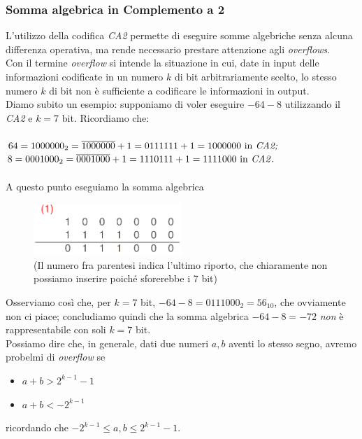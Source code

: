\subsubsection{Somma algebrica in Complemento a 2} L'utilizzo della codifica \textit{CA2} permette di eseguire somme algebriche senza alcuna differenza operativa, ma rende necessario prestare attenzione agli \textit{overflows}.\\
Con il termine \textit{overflow} si intende la situazione in cui, date in input delle informazioni codificate in un numero $k$ di bit arbitrariamente scelto, lo stesso numero $k$ di bit non è sufficiente a codificare le informazioni in output. \\
Diamo subito un esempio: supponiamo di voler eseguire $-64-8$ utilizzando il \textit{CA2} e $k=7$ bit. Ricordiamo che:\\\\
$64=1000000_{2}=\overline{1000000}+1=0111111+1=1000000 \text{ in \textit{CA2;}}$\\
$8=0001000_{2}=\overline{0001000}+1=1110111+1=1111000 \text{ in \textit{CA2}}.$\\\\
A questo punto eseguiamo la somma algebrica
\begin{figure}[H]
	\centering
	\includegraphics[width=0.5\textwidth,keepaspectratio]{images/overflow.png}
	\caption{(Il numero fra parentesi indica l'ultimo riporto, che chiaramente non possiamo inserire poiché sforerebbe i 7 bit)}
\end{figure}
Osserviamo così che, per $k=7$ bit, $-64-8=0111000_{2}=56_{10}$, che ovviamente non ci piace; concludiamo quindi che la somma algebrica $-64-8=-72$ \textit{non} è rappresentabile con soli $k=7$ bit.\\

Possiamo dire che, in generale, dati due numeri $a, b$ aventi lo stesso segno, avremo probelmi di \textit{overflow} se 
\begin{itemize}[noitemsep,nolistsep]
	\item $a+b>2^{k-1}-1$
	\item $a+b<-2^{k-1}$
\end{itemize}
ricordando che $-2^{k-1}\le a,b\le 2^{k-1}-1$.

